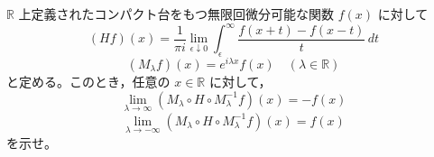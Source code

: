 \documentclass[12pt]{jlreq}
\newcommand{\R}{\mathbb{R}}
\begin{document}
$\R$ 上定義されたコンパクト台をもつ無限回微分可能な関数 $f(x)$ に対して
\[
  (Hf)(x) = \frac{1}{\pi i} \lim_{\epsilon\downarrow0} \int_\epsilon^\infty \frac{f(x+t) - f(x-t)}{t} \, dt
\]
\[
  (M_\lambda f)(x) = e^{i\lambda x} f(x) \quad (\lambda \in \R)
\]
と定める。このとき，任意の $x \in \R$ に対して，
\[
  \lim_{\lambda\to\infty} (M_\lambda \circ H \circ M_\lambda^{-1} f)(x) = -f(x)
\]
\[
  \lim_{\lambda\to-\infty} (M_\lambda \circ H \circ M_\lambda^{-1} f)(x) = f(x)
\]
を示せ。
\end{document}
